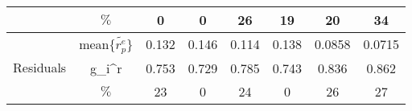 \begin{tabular}{|cc|c|c|c|c|c|c|}
          & $\%$ &                                        0 &                                        0 &                                       26 &                                       19 &                                       20 &                                       34 \\
\cline{1-8}
\hline \multirow{3}{*}{Residuals} & mean$\{\tilde{r_p^e}\}$ &                                    0.132 &                                    0.146 &                                    0.114 &                                    0.138 &                                   0.0858 &                                   0.0715 \\
          & g_i^r &                                    0.753 &                                    0.729 &                                    0.785 &                                    0.743 &                                    0.836 &                                    0.862 \\
          & $\%$ &                                       23 &                                        0 &                                       24 &                                        0 &                                       26 &                                       27 \\
\hline
\end{tabular}
